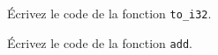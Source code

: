 \documentclass[11pt,a4paper,addpoint,answers]{exam}
\begin{document}
\begin{questions}
\ifprintanswers
\begin{solution}
\end{solution}
\else
\vspace{2in}
\fi

\question[1] Écrivez le code de la fonction \texttt{to_i32}.

\ifprintanswers
\begin{solution}
\end{solution}
\else
\vspace{2in}
\fi

\question[1] Écrivez le code de la fonction \texttt{add}.

\ifprintanswers
\begin{solution}
\end{solution}
\else
\vspace{2in}
\fi

  \end{questions}
\end{document}
